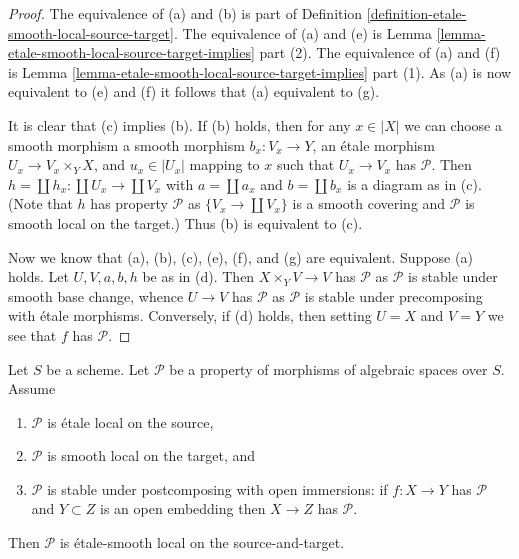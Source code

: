 \begin{proof}
The equivalence of (a) and (b) is part of
Definition \ref{definition-etale-smooth-local-source-target}.
The equivalence of (a) and (e) is
Lemma \ref{lemma-etale-smooth-local-source-target-implies} part (2).
The equivalence of (a) and (f) is
Lemma \ref{lemma-etale-smooth-local-source-target-implies} part (1).
As (a) is now equivalent to (e) and (f) it follows that
(a) equivalent to (g).

\medskip\noindent
It is clear that (c) implies (b). If (b) holds, then for any
$x \in |X|$ we can choose a smooth morphism a smooth morphism
$b_x : V_x \to Y$, an \'etale morphism $U_x \to V_x \times_Y X$,
and $u_x \in |U_x|$ mapping to $x$
such that $U_x \to V_x$ has $\mathcal{P}$.
Then $h = \coprod h_x : \coprod U_x \to \coprod V_x$
with $a = \coprod a_x$ and $b = \coprod b_x$ is a diagram as in (c).
(Note that $h$ has property $\mathcal{P}$ as $\{V_x \to \coprod V_x\}$
is a smooth covering and $\mathcal{P}$ is smooth local on the target.)
Thus (b) is equivalent to (c).

\medskip\noindent
Now we know that (a), (b), (c), (e), (f), and (g) are equivalent.
Suppose (a) holds. Let $U, V, a, b, h$ be as in (d). Then
$X \times_Y V \to V$ has $\mathcal{P}$ as $\mathcal{P}$ is stable under
smooth base change, whence $U \to V$ has $\mathcal{P}$ as $\mathcal{P}$
is stable under precomposing with \'etale morphisms. Conversely, if (d)
holds, then setting $U = X$ and $V = Y$ we see that $f$ has $\mathcal{P}$.
\end{proof}

\begin{lemma}
\label{lemma-etale-smooth-local-source-target}
Let $S$ be a scheme.
Let $\mathcal{P}$ be a property of morphisms of algebraic spaces over $S$.
Assume
\begin{enumerate}
\item $\mathcal{P}$ is \'etale local on the source,
\item $\mathcal{P}$ is smooth local on the target, and
\item $\mathcal{P}$ is stable under postcomposing with open immersions:
if $f : X \to Y$ has $\mathcal{P}$ and $Y \subset Z$ is an open embedding
then $X \to Z$ has $\mathcal{P}$.
\end{enumerate}
Then $\mathcal{P}$ is \'etale-smooth local on the source-and-target.
\end{lemma}

